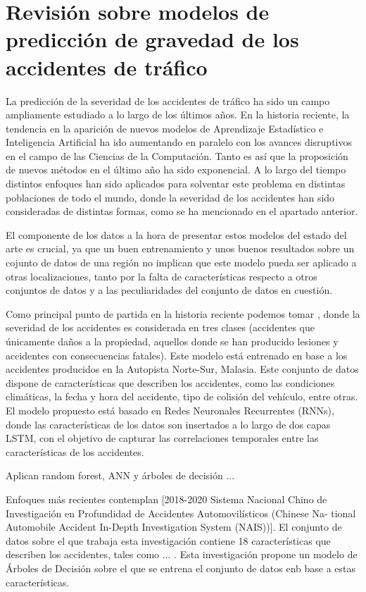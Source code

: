 \documentclass{uathesis-es}
\begin{document}
\section{Revisión sobre modelos de predicción de gravedad de los accidentes de tráfico}

La predicción de la severidad de los accidentes de tráfico ha sido un campo ampliamente estudiado a lo largo de los últimos años. En la historia reciente, la tendencia en la aparición de nuevos modelos de Aprendizaje Estadístico e Inteligencia Artificial ha ido aumentando en paralelo con los avances disruptivos en el campo de las Ciencias de la Computación. Tanto es así que la proposición de nuevos métodos en el último año ha sido exponencial. A lo largo del tiempo distintos enfoques han sido aplicados para solventar este problema en distintas poblaciones de todo el mundo, donde la severidad de los accidentes han sido consideradas de distintas formas, como se ha mencionado en el apartado anterior.

El componente de los datos a la hora de presentar estos modelos del estado del arte es crucial, ya que un buen entrenamiento y unos buenos resultados sobre un cojunto de datos de una región no implican que este modelo pueda ser aplicado a otras localizaciones, tanto por la falta de características respecto a otros conjuntos de datos y a las peculiaridades del conjunto de datos en cuestión.


Como principal punto de partida en la historia reciente podemos tomar \cite{app7060476}, donde la severidad de los accidentes es considerada en tres clases (accidentes que únicamente daños a la propiedad, aquellos donde se han producido lesiones y accidentes con consecuencias fatales). Este modelo está entrenado en base a los accidentes producidos en la Autopista Norte-Sur, Malasia. Este conjunto de datos dispone de características que describen los accidentes, como las condiciones climáticas, la fecha y hora del accidente, tipo de colisión del vehículo, entre otras. El modelo propuesto está basado en Redes Neuronales Recurrentes (RNNs), donde las características de los datos son insertados a lo largo de dos capas LSTM, con el objetivo de capturar las correlaciones temporales entre las características de los accidentes.

Aplican random forest, ANN y árboles de decisión \cite{app10010129}...

Enfoques más recientes contemplan \cite{Yang2023} [2018-2020 Sistema Nacional Chino de Investigación en Profundidad de Accidentes Automovilísticos (Chinese Na- tional Automobile Accident In-Depth Investigation System (NAIS))]. El conjunto de datos sobre el que trabaja esta investigación contiene 18 características que describen los accidentes, tales como ... . Esta investigación propone un modelo de Árboles de Decisión sobre el que se entrena el conjunto de datos enb base a estas características.
\end{document}

